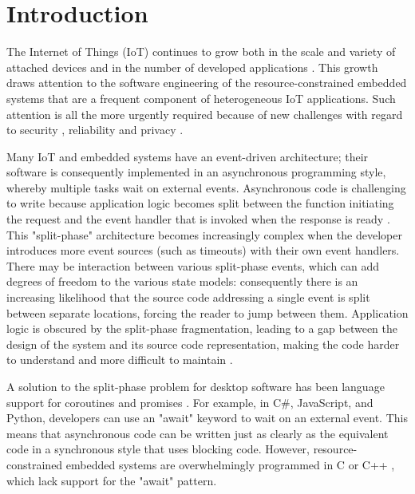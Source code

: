 \section{Introduction}


The Internet of Things (IoT) \cite{Al-Fuqaha2015, Atzori2010, Gubbi2013} continues to grow both in the scale and variety of attached devices and in the number of developed applications \cite{Manyika2015, VanderMeulen2017}. This growth draws attention to the software engineering of the resource-constrained embedded systems that are a frequent component of heterogeneous IoT applications. Such attention is all the more urgently required because of new challenges with regard to security \cite{Sicari2015}, reliability \cite{Gubbi2013} and privacy \cite{Weber2015}.

Many IoT and embedded systems have an event-driven architecture; their software is consequently implemented in an asynchronous programming style, whereby multiple tasks wait on external events. Asynchronous code is challenging to write because application logic becomes split between the function initiating the request and the event handler that is invoked when the response is ready \cite{Gay2003, Levis2002, Meijer2010}. This "split-phase" architecture becomes increasingly complex when the developer introduces more event sources (such as timeouts) with their own event handlers. There may be interaction between various split-phase events, which can add degrees of freedom to the various state models: consequently there is an increasing likelihood that the source code addressing a single event is split between separate locations, forcing the reader to jump between them. Application logic is obscured by the split-phase fragmentation, leading to a gap between the design of the system and its source code representation, making the code harder to understand and more difficult to maintain \cite{Brodu2015, Edwards2009, Madsen2017, Kambona2013}.

A solution to the split-phase problem for desktop software has been language support for coroutines \cite{Conway1963, Knuth1968, Marlin1979} and promises \cite{Brodu2015, Liskov1988, Madsen2017}. For example, in C\#, JavaScript, and Python, developers can use an "await" keyword to wait on an external event. This means that asynchronous code can be written just as clearly as the equivalent code in a synchronous style that uses blocking code. However, resource-constrained embedded systems are overwhelmingly programmed in C or C++ \cite{AspenCore2017, Skerrett2017}, which lack support for the "await" pattern.

